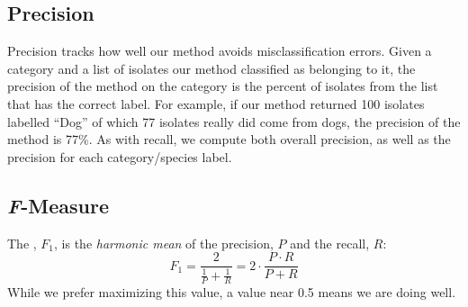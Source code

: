 \subsection{Precision}
Precision tracks how well our method avoids misclassification errors. 
Given a category and a list of isolates our method classified as belonging to it, the precision of the method on the
category is the percent of isolates from the list that has the correct label.
For example, if our method returned 100 isolates labelled ``Dog'' of which 77 isolates really did come from dogs, the precision of the method is 77\%. As with recall, we compute both overall precision, as well as the precision for each category/species label.

\subsection{\textit{F}-Measure}
The \fmeasure{}, $F_1$, is the \textit{harmonic mean} of the precision, $P$ and the recall, $R$:
\begin{equation*}
    F_1 
    =
    \frac{2}{\frac{1}{P}
    +
    \frac{1}{R}}
    = 2\cdot
    \frac{P\cdot R}
    {P + R}
\end{equation*}
While we prefer maximizing this value, a value near 0.5 means we are doing well.
